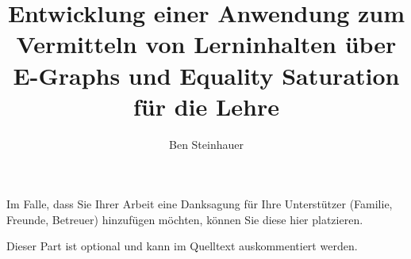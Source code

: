 \documentclass{hhuthesis}
\author{Ben Steinhauer}
\title{Entwicklung einer Anwendung zum Vermitteln von Lerninhalten über E-Graphs und Equality Saturation für die Lehre}
\begin{document}
\frontmatter
\makefrontmatter

\begin{acknowledgements}
  Im Falle, dass Sie Ihrer Arbeit eine Danksagung für Ihre Unterstützer
  (Familie, Freunde, Betreuer)
  hinzufügen möchten, können Sie diese hier platzieren.

  Dieser Part ist optional und kann im Quelltext auskommentiert werden.
\end{acknowledgements}


\tableofcontents


\mainmatter




% 



\backmatter
\listoffigures
\listoftables

\clearpage

\end{document}
